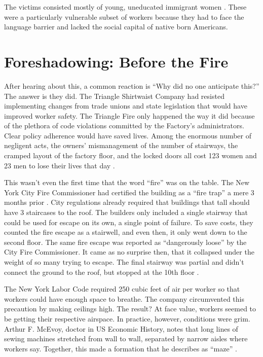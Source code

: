 \documentclass[12pt]{article}
\begin{document}
The victims consisted mostly of young, uneducated immigrant women
\parencite{martineztriangle}. These were a particularly vulnerable subset of
workers because they had to face the language barrier and lacked the social
capital of native born Americans.




\section{Foreshadowing: Before the Fire}


After hearing about this, a common reaction is ``Why did no one anticipate
this?'' The answer is they did. The Triangle Shirtwaist Company had resisted
implementing changes from trade unions and state legislation that would have
improved worker safety. The Triangle Fire only happened the way it did because
of the plethora of code violations committed by the Factory's administrators.
Clear policy adherence would have saved lives. Among the enormous number of
negligent acts, the owners' mismanagement of the number of stairways, the
cramped layout of the factory floor, and the locked doors all cost 123 women and
23 men to lose their lives that day \parencite{von2004triangle}.

This wasn't even the first time that the word ``fire'' was on the table. The New
York City Fire Commissioner had certified the building as a ``fire trap'' a mere
3 months prior \parencite[627]{Ev1995}. City regulations already required that
buildings that tall should have 3 staircases to the roof. The builders only
included a single stairway that could be used for escape on its own, a single
point of failure. To save costs, they counted the fire escape as a stairwell,
and even then, it only went down to the second floor. The same fire escape was
reported as ``dangerously loose'' by the City Fire Commissioner. It came as no
surprise then, that it collapsed under the weight of so many trying to escape.
The final stairway was partial and didn't connect the ground to the roof, but
stopped at the 10th floor \parencite[627]{Ev1995}.

The New York Labor Code required 250 cubic feet of air per worker so that
workers could have enough space to breathe. The company circumvented this
precaution by making ceilings high. The result? At face value, workers seemed to
be getting their respective airspace. In practice, however, conditions were
grim. Arthur F. McEvoy, doctor in US Economic History, notes that long lines of
sewing machines stretched from wall to wall, separated by narrow aisles where
workers say. Together, this made a formation that he describes as ``maze''
\parencite[628]{Ev1995}.
\end{document}
